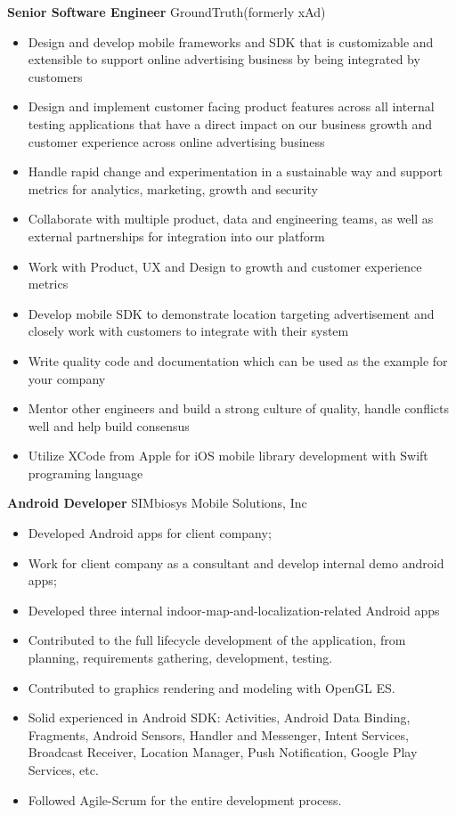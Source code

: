 \documentclass[12pt,letterpaper,sans]{moderncv}        %
\begin{document}
\vspace*{0.5cm}
{\textbf{Senior Software Engineer}}
{GroundTruth(formerly xAd)}{}{}{
\begin{itemize}
\item Design and develop mobile frameworks and SDK that is customizable and extensible to support online advertising business by being integrated by customers
\item Design and implement customer facing product features across all internal testing applications that have a direct impact on our business growth and customer experience across online advertising business
\item Handle rapid change and experimentation in a sustainable way and support metrics for analytics, marketing, growth and security
\item Collaborate with multiple product, data and engineering teams, as well as external partnerships for integration into our platform
\item Work with Product, UX and Design to growth and customer experience metrics
\item Develop mobile SDK to demonstrate location targeting advertisement and closely work with customers to integrate with their system
\item Write quality code and documentation which can be used as the example for your company
\item Mentor other engineers and build a strong culture of quality, handle conflicts well and help build consensus
\item Utilize XCode from Apple for iOS mobile library development with Swift programing language
\end{itemize}} 

\vspace*{0.5cm}
{\textbf{Android Developer}}
{SIMbiosys Mobile Solutions, Inc}{}{}{
\begin{itemize}
\item Developed Android apps for client company;
\item Work for client company as a consultant and develop internal demo android apps;
\item Developed three internal indoor-map-and-localization-related Android apps
\item Contributed to the full lifecycle development of the application, from planning, requirements gathering, development, testing.
\item Contributed to graphics rendering and modeling with OpenGL ES.
\item Solid experienced in Android SDK: Activities, Android Data Binding, Fragments, Android Sensors, Handler and Messenger, Intent Services, Broadcast Receiver, Location Manager, Push Notification, Google Play Services, etc.
\item Followed Agile-Scrum for the entire development process.
\end{itemize}} 
\end{document}
